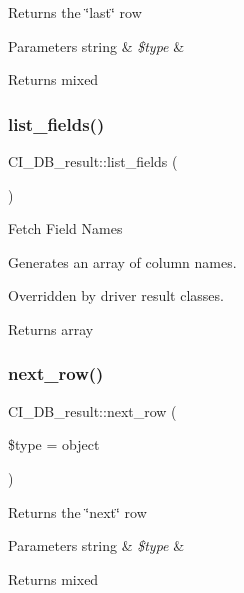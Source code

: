 Returns the \char`\"{}last\char`\"{} row


\begin{DoxyParams}[1]{Parameters}
string & {\em \$type} & \\
\hline
\end{DoxyParams}
\begin{DoxyReturn}{Returns}
mixed 
\end{DoxyReturn}
\mbox{\label{class_c_i___d_b__result_a4b6a5075f24b2595a92c4e7f37d770a0}} 
\subsubsection{\texorpdfstring{list\+\_\+fields()}{list\_fields()}}
{\footnotesize\ttfamily C\+I\+\_\+\+D\+B\+\_\+result\+::list\+\_\+fields (\begin{DoxyParamCaption}{ }\end{DoxyParamCaption})}

Fetch Field Names

Generates an array of column names.

Overridden by driver result classes.

\begin{DoxyReturn}{Returns}
array 
\end{DoxyReturn}
\mbox{\label{class_c_i___d_b__result_aa2c850190bed89ee860ea73caca7937d}} 
\subsubsection{\texorpdfstring{next\+\_\+row()}{next\_row()}}
{\footnotesize\ttfamily C\+I\+\_\+\+D\+B\+\_\+result\+::next\+\_\+row (\begin{DoxyParamCaption}\item[{}]{\$type = {\ttfamily \textquotesingle{}object\textquotesingle{}} }\end{DoxyParamCaption})}

Returns the \char`\"{}next\char`\"{} row


\begin{DoxyParams}[1]{Parameters}
string & {\em \$type} & \\
\hline
\end{DoxyParams}
\begin{DoxyReturn}{Returns}
mixed 
\end{DoxyReturn}
\mbox{\label{class_c_i___d_b__result_a1dbf6be1e4f7d502a83459e63366e952}} 
